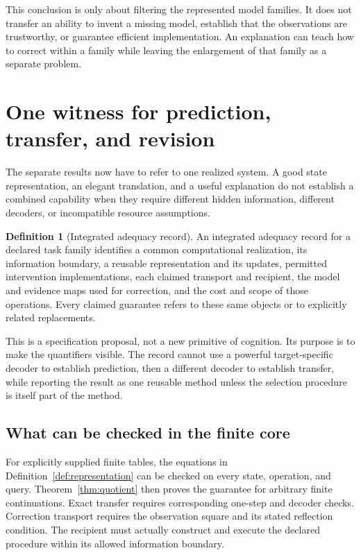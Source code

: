 \documentclass[11pt,letterpaper]{article}
\theoremstyle{plain}
\theoremstyle{definition}
\newtheorem{definition}[theorem]{Definition}
\begin{document}
This conclusion is only about filtering the represented model families. It does not transfer an ability to invent a missing model, establish that the observations are trustworthy, or guarantee efficient implementation. An explanation can teach how to correct within a family while leaving the enlargement of that family as a separate problem.

\section{One witness for prediction, transfer, and revision}\label{sec:witness}
The separate results now have to refer to one realized system. A good state representation, an elegant translation, and a useful explanation do not establish a combined capability when they require different hidden information, different decoders, or incompatible resource assumptions.

\begin{definition}[Integrated adequacy record]\label{def:witness}
An integrated adequacy record for a declared task family identifies a common computational realization, its information boundary, a reusable representation and its updates, permitted intervention implementations, each claimed transport and recipient, the model and evidence maps used for correction, and the cost and scope of those operations. Every claimed guarantee refers to these same objects or to explicitly related replacements.
\end{definition}
This is a specification proposal, not a new primitive of cognition. Its purpose is to make the quantifiers visible. The record cannot use a powerful target-specific decoder to establish prediction, then a different decoder to establish transfer, while reporting the result as one reusable method unless the selection procedure is itself part of the method.

\subsection{What can be checked in the finite core}
For explicitly supplied finite tables, the equations in Definition~\ref{def:representation} can be checked on every state, operation, and query. Theorem~\ref{thm:quotient} then proves the guarantee for arbitrary finite continuations. Exact transfer requires corresponding one-step and decoder checks. Correction transport requires the observation square and its stated reflection condition. The recipient must actually construct and execute the declared procedure within its allowed information boundary.
\end{document}
